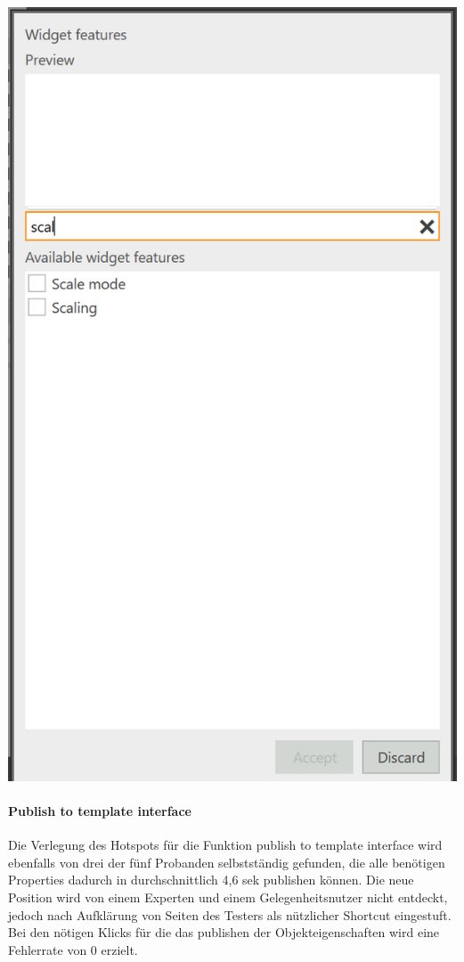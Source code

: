 \begin{center}
  \includegraphics[scale= 0.6]{figures/Feature_Test.PNG}
  \label{fig:Feature_Test}
\end{center}

\paragraph{Publish to template interface}
Die Verlegung des Hotspots für die Funktion \glqq publish to template interface\grqq{} wird ebenfalls von drei der fünf Probanden selbstständig gefunden, die alle benötigen Properties dadurch in durchschnittlich 4,6 sek publishen können.
Die neue Position wird von einem Experten und einem Gelegenheitsnutzer nicht entdeckt, jedoch nach Aufklärung von Seiten des Testers als nützlicher Shortcut eingestuft.
Bei den nötigen Klicks für die das publishen der Objekteigenschaften wird eine Fehlerrate von 0 erzielt.

